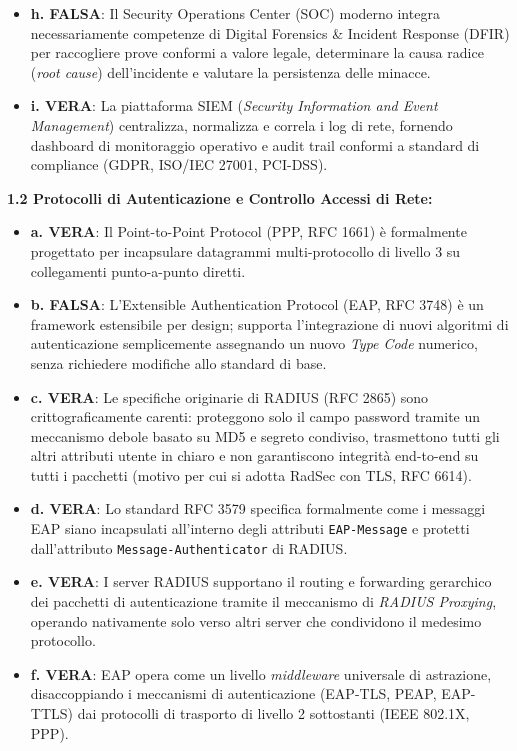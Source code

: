 \documentclass[11pt,a4paper]{article}
\begin{document}
\begin{solutionbox}
\begin{itemize}
    \item \textbf{h. FALSA}: Il Security Operations Center (SOC) moderno integra necessariamente competenze di Digital Forensics \& Incident Response (DFIR) per raccogliere prove conformi a valore legale, determinare la causa radice (\textit{root cause}) dell'incidente e valutare la persistenza delle minacce.
    \item \textbf{i. VERA}: La piattaforma SIEM (\textit{Security Information and Event Management}) centralizza, normalizza e correla i log di rete, fornendo dashboard di monitoraggio operativo e audit trail conformi a standard di compliance (GDPR, ISO/IEC 27001, PCI-DSS).
\end{itemize}

\textbf{1.2 Protocolli di Autenticazione e Controllo Accessi di Rete:}
\begin{itemize}
    \item \textbf{a. VERA}: Il Point-to-Point Protocol (PPP, RFC 1661) \`e formalmente progettato per incapsulare datagrammi multi-protocollo di livello 3 su collegamenti punto-a-punto diretti.
    \item \textbf{b. FALSA}: L'Extensible Authentication Protocol (EAP, RFC 3748) \`e un framework estensibile per design; supporta l'integrazione di nuovi algoritmi di autenticazione semplicemente assegnando un nuovo \textit{Type Code} numerico, senza richiedere modifiche allo standard di base.
    \item \textbf{c. VERA}: Le specifiche originarie di RADIUS (RFC 2865) sono crittograficamente carenti: proteggono solo il campo password tramite un meccanismo debole basato su MD5 e segreto condiviso, trasmettono tutti gli altri attributi utente in chiaro e non garantiscono integrit\`a end-to-end su tutti i pacchetti (motivo per cui si adotta RadSec con TLS, RFC 6614).
    \item \textbf{d. VERA}: Lo standard RFC 3579 specifica formalmente come i messaggi EAP siano incapsulati all'interno degli attributi \texttt{EAP-Message} e protetti dall'attributo \texttt{Message-Authenticator} di RADIUS.
    \item \textbf{e. VERA}: I server RADIUS supportano il routing e forwarding gerarchico dei pacchetti di autenticazione tramite il meccanismo di \textit{RADIUS Proxying}, operando nativamente solo verso altri server che condividono il medesimo protocollo.
    \item \textbf{f. VERA}: EAP opera come un livello \textit{middleware} universale di astrazione, disaccoppiando i meccanismi di autenticazione (EAP-TLS, PEAP, EAP-TTLS) dai protocolli di trasporto di livello 2 sottostanti (IEEE 802.1X, PPP).

\end{itemize}
\end{solutionbox}
\end{document}
